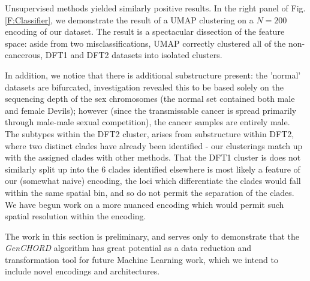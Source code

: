 \documentclass[fleqn,usenatbib]{acmart}
\def\codename{\textit{GenCHORD}}
\begin{document}
{				Unsupervised methods yielded similarly positive results. In the right panel of Fig. \ref{F:Classifier}, we demonstrate the result of a UMAP clustering\cite{UMAP2018} on a $N=200$ encoding of our dataset. The result is a spectacular dissection of the feature space: aside from two misclassifications, UMAP correctly clustered all of the non-cancerous, DFT1 and DFT2 datasets into isolated clusters. 
			
				In addition, we notice that there is additional substructure present: the 'normal' datasets are bifurcated, investigation revealed this to be based solely on the sequencing depth of the sex chromosomes (the normal set contained both male and female Devils); however (since the transmissable cancer is spread primarily through male-male sexual competition), the cancer samples are entirely male. The subtypes within the DFT2 cluster, arises from substructure within DFT2, where two distinct clades have already been identified\cite{Stammnitz2023} - our clusterings match up with the assigned clades with other methods. That the DFT1 cluster is does not similarly split up into the 6 clades identified elsewhere is most likely a feature of our (somewhat naive) encoding, the loci which differentiate the clades would fall within the same spatial bin, and so do not permit the separation of the clades. We have begun work on a more nuanced encoding which would permit such spatial resolution within the encoding.


				The work in this section is preliminary, and serves only to demonstrate that the \codename{} algorithm has great potential as a data reduction and transformation tool for future Machine Learning work, which we intend to include novel encodings and architectures.
		

}
\end{document}
